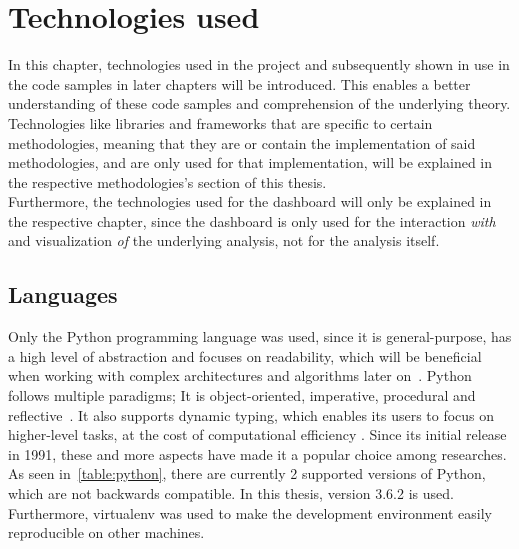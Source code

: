
\chapter{Technologies used}
\label{ch:technologiesUsed}

In this chapter, technologies used in the project and subsequently shown in use in the code samples in later chapters will be introduced.
This enables a better understanding of these code samples and comprehension of the underlying theory.
\\
Technologies like libraries and frameworks that are specific to certain methodologies,
meaning that they are or contain the implementation of said methodologies,
and are only used for that implementation,
will be explained in the respective methodologies's section of this thesis.
\\
Furthermore, the technologies used for the dashboard will only be explained in the respective chapter,
since the dashboard is only used for the interaction \textit{with} and visualization \textit{of} the underlying analysis,
not for the analysis itself.

\section{Languages}
\label{sec:languages}

Only the Python programming language was used, since it is general-purpose,
has a high level of abstraction and focuses on readability,
which will be beneficial when working with complex architectures and algorithms later on~\cite{pythonDocs}.
Python follows multiple paradigms; It is object-oriented, imperative, procedural and reflective~\cite{van2007python}.
It also supports dynamic typing, which enables its users to focus on higher-level tasks, at the cost of computational efficiency \cite{Perez-schofield2010}.
Since its initial release in 1991, these and more aspects have made it a popular choice among researches.
As seen in~\ref{table:python}, there are currently 2 supported versions of Python, which are not backwards compatible.
In this thesis, version 3.6.2 is used.
Furthermore, virtualenv was used to make the development environment easily reproducible on other machines.

